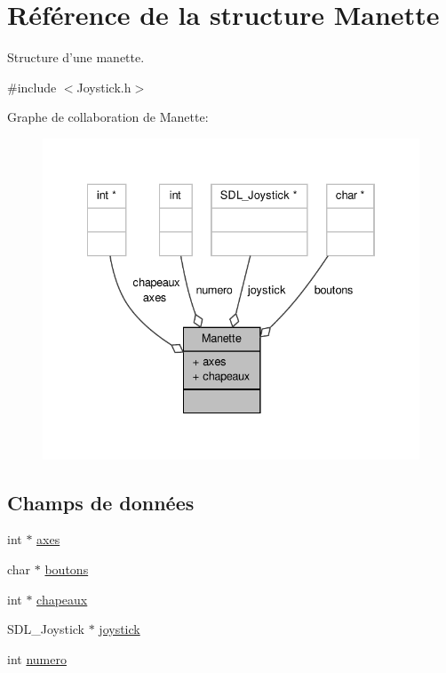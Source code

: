 \hypertarget{structManette}{\section{Référence de la structure Manette}
\label{structManette}
}


Structure d'une manette.  




{\ttfamily \#include $<$Joystick.\-h$>$}



Graphe de collaboration de Manette\-:\nopagebreak
\begin{figure}[H]
\begin{center}
\leavevmode
\includegraphics[width=334pt]{structManette__coll__graph}
\end{center}
\end{figure}
\subsection*{Champs de données}
\begin{DoxyCompactItemize}
\item 
int $\ast$ \hyperlink{structManette_abc9f5234f07d79af9735b501956a8d60}{axes}
\item 
char $\ast$ \hyperlink{structManette_a07814b5f1ebd865b6e15d2094cf5d671}{boutons}
\item 
int $\ast$ \hyperlink{structManette_ab12d322b8fadc5e42218b065e7f86d65}{chapeaux}
\item 
S\-D\-L\-\_\-\-Joystick $\ast$ \hyperlink{structManette_ad11c45cf2d1afa059fae52ab61a177d8}{joystick}
\item 
int \hyperlink{structManette_aedc72637b122d8d34ce23f4cf98be10b}{numero}
\end{DoxyCompactItemize}


